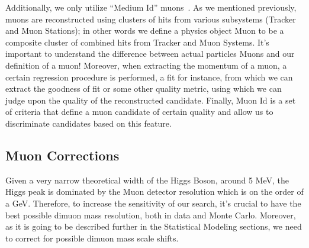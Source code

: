 Additionally, we only utilize ``Medium Id'' muons~\cite{CMS-MuonPOG}. As we mentioned previously, muons are reconstructed using clusters of hits from various subsystems (Tracker and Muon Stations); in other words we define a physics object Muon to be a composite cluster of combined hits from Tracker and Muon Systems. It's important to understand the difference between actual particles Muons and our definition of a muon! Moreover, when extracting the momentum of a muon, a certain regression procedure is performed, a fit for instance, from which we can extract the goodness of fit or some other quality metric, using which we can judge upon the quality of the reconstructed candidate. Finally, Muon Id is a set of criteria that define a muon candidate of certain quality and allow us to discriminate candidates based on this feature.

\subsection{Muon Corrections}
Given a very narrow theoretical width of the Higgs Boson, around 5 MeV, the Higgs peak is dominated by the Muon detector resolution which is on the order of a GeV. Therefore, to increase the sensitivity of our search, it's crucial to have the best possible dimuon mass resolution, both in data and Monte Carlo. Moreover, as it is going to be described further in the Statistical Modeling sections, we need to correct for possible dimuon mass scale shifts.

